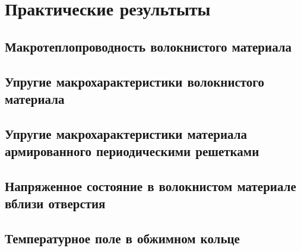 \chapter{Практические результыты}\label{ch:ch3}

\section{Макротеплопроводность волокнистого материала}\label{ch:ch3/sect1}

\section{Упругие макрохарактеристики волокнистого материала}\label{ch:ch3/sect2}

\section{Упругие макрохарактеристики материала армированного периодическими решетками}\label{ch:ch3/sect3}

\section{Напряженное состояние в волокнистом материале вблизи отверстия}\label{ch:ch3/sect4}

\section{Температурное поле в обжимном кольце}\label{ch:ch3/sect5}

\clearpage
